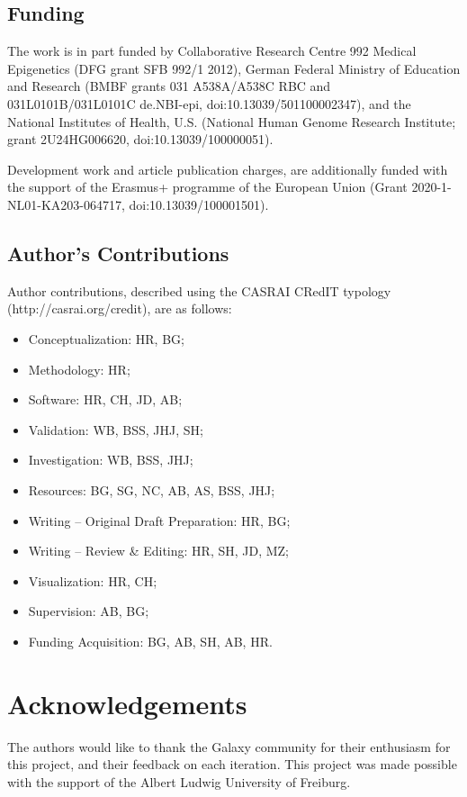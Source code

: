 \documentclass[a4paper,num-refs]{oup-contemporary}
\begin{document}
\subsection{Funding}
The work is in part funded by Collaborative Research Centre 992 Medical Epigenetics (DFG grant SFB 992/1 2012), German Federal Ministry of Education and Research (BMBF grants 031 A538A/A538C RBC and 031L0101B/031L0101C de.NBI-epi, doi:10.13039/501100002347), and the National Institutes of Health, U.S. (National Human Genome Research Institute; grant 2U24HG006620, doi:10.13039/100000051).

Development work and article publication charges, are additionally funded with the support of the Erasmus+ programme of the European Union (Grant 2020-1-NL01-KA203-064717, doi:10.13039/100001501).

\subsection{Author's Contributions}
Author contributions, described using the CASRAI CRedIT typology (http://casrai.org/credit), are as follows:

\begin{itemize}
    \item Conceptualization: HR, BG;
    \item Methodology: HR;
    \item Software: HR, CH, JD, AB;
    \item Validation: WB, BSS, JHJ, SH;
    \item Investigation: WB, BSS, JHJ;
    \item Resources: BG, SG, NC, AB, AS, BSS, JHJ;
    \item Writing – Original Draft Preparation: HR, BG;
    \item Writing – Review \& Editing: HR, SH, JD, MZ;
    \item Visualization: HR, CH;
    \item Supervision: AB, BG;
    \item Funding Acquisition: BG, AB, SH, AB, HR.
\end{itemize}

\section{Acknowledgements}
The authors would like to thank the Galaxy community for their enthusiasm for this project, and their feedback on each iteration.
This project was made possible with the support of the Albert Ludwig University of Freiburg.


\end{document}
